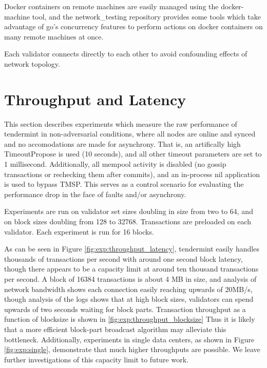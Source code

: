 Docker containers on remote machines are easily managed using the docker-machine tool, 
and the network\_testing repository provides some tools which take advantage of go's concurrency features
to perform actions on docker containers on many remote machines at once.

Each validator connects directly to each other to avoid confounding effects of network topology.

\section{Throughput and Latency}

This section describes experiments which measure the raw performance of tendermint in non-adversarial conditions,
where all nodes are online and synced and no accomodations are made for asynchrony.
That is, an artifically high TimeoutPropose is used (10 seconds), and all other timeout parameters are set to 1 millisecond.
Additionally, all mempool activity is disabled (no gossip transactions or rechecking them after commits),
and an in-process nil application is used to bypass TMSP.
This serves as a control scenario for evaluating the performance drop in the face of faults and/or asynchrony.

Experiments are run on validator set sizes doubling in size from two to 64, and on block sizes doubling from 128 to 32768.
Transactions are preloaded on each validator. Each experiment is run for 16 blocks. 

As can be seen in Figure \ref{fig:exp:throughput_latency}, 
tendermint easily handles thousands of transactions per second with around one second block latency,
though there appears to be a capacity limit at around ten thousand transactions per second.
A block of 16384 transactions is about 4 MB in size, and analysis of network bandwidth shows each connection
easily reaching upwards of 20MB/s, though analysis of the logs shows that at high block sizes, 
validators can spend upwards of two seconds waiting for block parts.
Transaction throughput as a function of blocksize is shown in \ref{fig:exp:throughput_blocksize}
Thus it is likely that a more efficient block-part broadcast algorithm may alleviate this bottleneck.
Additionally, experiments in single data centers, as shown in Figure \ref{fig:exp:single},
demonstrate that much higher throughputs are possible. We leave further investigations of this capacity limit to future work.


